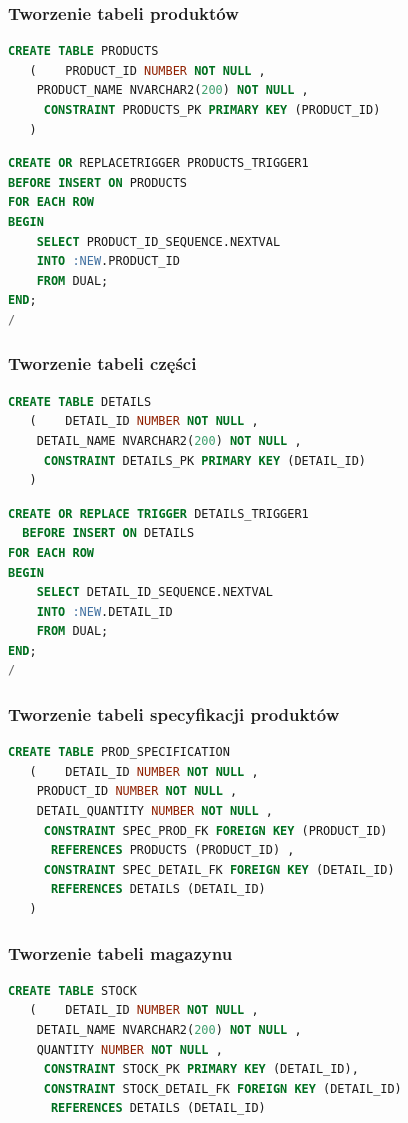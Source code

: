 \documentclass{article}
\begin{document}
\subsubsection{Tworzenie tabeli produktów}
\begin{lstlisting}[language=SQL,frame=single]
  CREATE TABLE PRODUCTS 
   (	PRODUCT_ID NUMBER NOT NULL , 
	PRODUCT_NAME NVARCHAR2(200) NOT NULL , 
	 CONSTRAINT PRODUCTS_PK PRIMARY KEY (PRODUCT_ID)
   )
\end{lstlisting}
\begin{lstlisting}[language=SQL,frame=single]
  CREATE OR REPLACETRIGGER PRODUCTS_TRIGGER1 
BEFORE INSERT ON PRODUCTS
FOR EACH ROW
BEGIN
	SELECT PRODUCT_ID_SEQUENCE.NEXTVAL
	INTO :NEW.PRODUCT_ID
	FROM DUAL;
END;
/
\end{lstlisting}

\subsubsection{Tworzenie tabeli części}
\begin{lstlisting}[language=SQL,frame=single]
   CREATE TABLE DETAILS 
   (	DETAIL_ID NUMBER NOT NULL , 
	DETAIL_NAME NVARCHAR2(200) NOT NULL , 
	 CONSTRAINT DETAILS_PK PRIMARY KEY (DETAIL_ID)
   )
\end{lstlisting}
\begin{lstlisting}[language=SQL,frame=single]
  CREATE OR REPLACE TRIGGER DETAILS_TRIGGER1 
  BEFORE INSERT ON DETAILS
FOR EACH ROW
BEGIN
	SELECT DETAIL_ID_SEQUENCE.NEXTVAL
	INTO :NEW.DETAIL_ID
	FROM DUAL;
END;
/
\end{lstlisting}

\newpage
\subsubsection{Tworzenie tabeli specyfikacji produktów}
\begin{lstlisting}[language=SQL,frame=single]
  CREATE TABLE PROD_SPECIFICATION 
   (	DETAIL_ID NUMBER NOT NULL , 
	PRODUCT_ID NUMBER NOT NULL , 
	DETAIL_QUANTITY NUMBER NOT NULL , 
	 CONSTRAINT SPEC_PROD_FK FOREIGN KEY (PRODUCT_ID)
	  REFERENCES PRODUCTS (PRODUCT_ID) , 
	 CONSTRAINT SPEC_DETAIL_FK FOREIGN KEY (DETAIL_ID)
	  REFERENCES DETAILS (DETAIL_ID) 
   ) 
\end{lstlisting}

\subsubsection{Tworzenie tabeli magazynu}
\begin{lstlisting}[language=SQL,frame=single]
  CREATE TABLE STOCK 
   (	DETAIL_ID NUMBER NOT NULL , 
	DETAIL_NAME NVARCHAR2(200) NOT NULL , 
	QUANTITY NUMBER NOT NULL , 
	 CONSTRAINT STOCK_PK PRIMARY KEY (DETAIL_ID), 
	 CONSTRAINT STOCK_DETAIL_FK FOREIGN KEY (DETAIL_ID)
	  REFERENCES DETAILS (DETAIL_ID)
\end{lstlisting}
\end{document}
